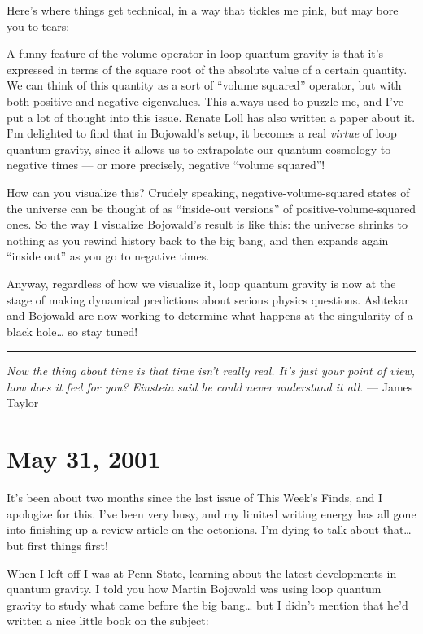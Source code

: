 \documentclass{article}
\begin{document}
Here's where things get technical, in a way that tickles me pink, but
may bore you to tears:

A funny feature of the volume operator in loop quantum gravity is that
it's expressed in terms of the square root of the absolute value of a
certain quantity. We can think of this quantity as a sort of ``volume
squared'' operator, but with both positive and negative eigenvalues.
This always used to puzzle me, and I've put a lot of thought into this
issue. Renate Loll has also written a paper about it. I'm delighted to
find that in Bojowald's setup, it becomes a real \emph{virtue} of loop
quantum gravity, since it allows us to extrapolate our quantum cosmology
to negative times --- or more precisely, negative ``volume squared''!

How can you visualize this? Crudely speaking, negative-volume-squared
states of the universe can be thought of as ``inside-out versions'' of
positive-volume-squared ones. So the way I visualize Bojowald's result
is like this: the universe shrinks to nothing as you rewind history back
to the big bang, and then expands again ``inside out'' as you go to
negative times.

Anyway, regardless of how we visualize it, loop quantum gravity is now
at the stage of making dynamical predictions about serious physics
questions. Ashtekar and Bojowald are now working to determine what
happens at the singularity of a black hole\ldots{} so stay tuned!

\begin{center}\rule{0.5\linewidth}{0.5pt}\end{center}

\emph{Now the thing about time is that time isn't really real. It's just
your point of view, how does it feel for you? Einstein said he could
never understand it all.} --- James Taylor



\hypertarget{week168}{%
\section{May 31, 2001}\label{week168}}

It's been about two months since the last issue of This Week's Finds,
and I apologize for this. I've been very busy, and my limited writing
energy has all gone into finishing up a review article on the octonions.
I'm dying to talk about that\ldots{} but first things first!

When I left off I was at Penn State, learning about the latest
developments in quantum gravity. I told you how Martin Bojowald was
using loop quantum gravity to study what came before the big
bang\ldots{} but I didn't mention that he'd written a nice little book
on the subject:
\end{document}
